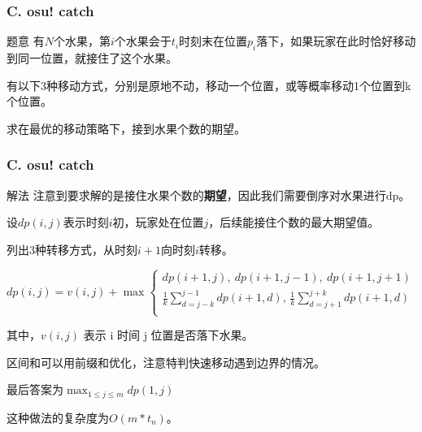 \renewcommand{\problemname}{C. osu! catch}

\begin{frame}\frametitle{\problemname}
    \begin{block}{题意}
	有$N$个水果，第$i$个水果会于$t_i$时刻末在位置$p_i$落下，如果玩家在此时恰好移动到同一位置，就接住了这个水果。

	有以下3种移动方式，分别是原地不动，移动一个位置，或等概率移动1个位置到k个位置。

	求在最优的移动策略下，接到水果个数的期望。
	\end{block}
	
\end{frame}

\begin{frame}\frametitle{\problemname}
	\begin{block}{解法}
		注意到要求解的是接住水果个数的\textbf{期望}，因此我们需要倒序对水果进行dp。

		设$dp(i, j)$表示时刻$i$初，玩家处在位置$j$，后续能接住个数的最大期望值。

		列出3种转移方式，从时刻$i+1$向时刻$i$转移。
		
		\vspace{-0.2in}
		$$
		dp(i, j)=v(i,j)+\max\begin{cases}
			dp(i+1, j),\ dp(i+1, j-1),\ dp(i+1, j+1)&\\
			\frac{1}{k}\sum_{d=j-k}^{j-1}dp(i+1, d),\, \frac{1}{k}\sum_{d=j+1}^{j+k}dp(i+1, d)&\\
		\end{cases}
		$$

		其中，$v(i,j)$ 表示 i 时间 j 位置是否落下水果。

		区间和可以用前缀和优化，注意特判快速移动遇到边界的情况。

		最后答案为$\max_{1\leq j \leq m}dp(1, j)$

		这种做法的复杂度为$O(m*t_n)$。
	\end{block}

\end{frame}
